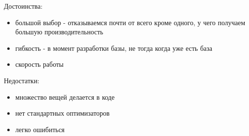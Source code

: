 Достоинства:
\begin{itemize}
    \item большой выбор - отказываемся почти от всего кроме одного, у чего получаем
большую производительность
    \item гибкость - в момент разработки базы, не тогда когда уже есть база
    \item скорость работы
\end{itemize}

Недостатки:
\begin{itemize}
    \item множество вещей делается в коде
    \item нет стандартных оптимизаторов
    \item легко ошибиться
\end{itemize}
